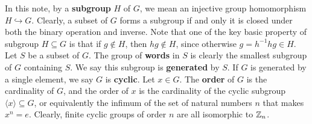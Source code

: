 \documentclass{report}
\begin{document}
In this note, by a \textbf{subgroup} $H$ of $G$, we mean an injective group homomorphism $H \hookrightarrow G $. Clearly, a subset of $G$ forms a subgroup if and only it is closed under both the binary operation and inverse. Note that one of the key basic property of subgroup $H \subseteq G$ is that if $g \not \in H$, then $hg \not \in H$, since otherwise $g=h^{-1}hg \in H$. \\







Let $S$ be a subset of $G$. The group of \textbf{words} in $S$ is clearly the smallest subgroup of $G$ containing $S$. We say this subgroup is \textbf{generated} by $S$. If $G$ is generated by a single element, we say $G$ is \textbf{cyclic}. Let $x \in G$. The \textbf{order} of $G$ is the cardinality of $G$, and the order of  $x$ is the cardinality of the cyclic subgroup $\langle x\rangle \subseteq G$, or equivalently the infimum of the set of natural numbers $n$ that makes $x^n=e$. Clearly, finite cyclic groups of order $n$ are all isomorphic to  $\mathbb{Z}_n$.  \\
\end{document}
